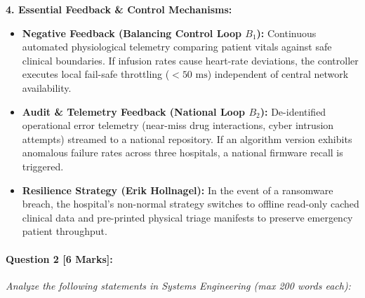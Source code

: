 \begin{tcolorbox}[colback=white,colframe=seSecondary,title={\small \textbf{Model Solution for Q1 (W24 Midsem):}}]
\textbf{4. Essential Feedback \& Control Mechanisms:}
\begin{itemize}[leftmargin=1.5em, itemsep=1pt]
    \item \textbf{Negative Feedback (Balancing Control Loop $B_1$):} Continuous automated physiological telemetry comparing patient vitals against safe clinical boundaries. If infusion rates cause heart-rate deviations, the controller executes local fail-safe throttling ($< 50\text{ ms}$) independent of central network availability.
    \item \textbf{Audit \& Telemetry Feedback (National Loop $B_2$):} De-identified operational error telemetry (near-miss drug interactions, cyber intrusion attempts) streamed to a national repository. If an algorithm version exhibits anomalous failure rates across three hospitals, a national firmware recall is triggered.
    \item \textbf{Resilience Strategy (Erik Hollnagel):} In the event of a ransomware breach, the hospital's non-normal strategy switches to offline read-only cached clinical data and pre-printed physical triage manifests to preserve emergency patient throughput.
\end{itemize}
\end{tcolorbox}

\vspace{0.8em}
\paragraph{Question 2 [6 Marks]:}
\textit{Analyze the following statements in Systems Engineering (max 200 words each):}

